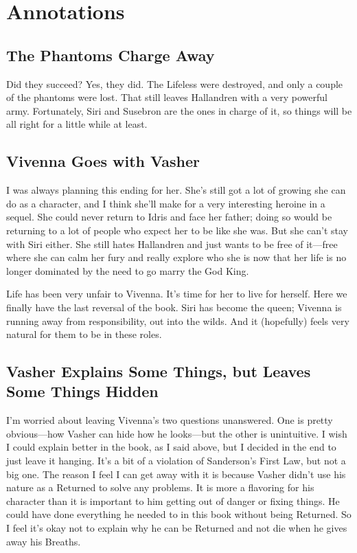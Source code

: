 \documentclass{article}
\begin{document}
\section{Annotations}

\subsection*{The Phantoms Charge Away}

Did they succeed? Yes, they did. The Lifeless were destroyed, and only a couple of the phantoms were lost. That still leaves Hallandren with a very powerful army. Fortunately, Siri and Susebron are the ones in charge of it, so things will be all right for a little while at least.

\subsection*{Vivenna Goes with Vasher}

I was always planning this ending for her. She’s still got a lot of growing she can do as a character, and I think she’ll make for a very interesting heroine in a sequel. She could never return to Idris and face her father; doing so would be returning to a lot of people who expect her to be like she was. But she can’t stay with Siri either. She still hates Hallandren and just wants to be free of it—free where she can calm her fury and really explore who she is now that her life is no longer dominated by the need to go marry the God King.

Life has been very unfair to Vivenna. It’s time for her to live for herself. Here we finally have the last reversal of the book. Siri has become the queen; Vivenna is running away from responsibility, out into the wilds. And it (hopefully) feels very natural for them to be in these roles.

\subsection*{Vasher Explains Some Things, but Leaves Some Things Hidden}

I’m worried about leaving Vivenna’s two questions unanswered. One is pretty obvious—how Vasher can hide how he looks—but the other is unintuitive. I wish I could explain better in the book, as I said above, but I decided in the end to just leave it hanging. It’s a bit of a violation of Sanderson’s First Law, but not a big one. The reason I feel I can get away with it is because Vasher didn’t use his nature as a Returned to solve any problems. It is more a flavoring for his character than it is important to him getting out of danger or fixing things. He could have done everything he needed to in this book without being Returned. So I feel it’s okay not to explain why he can be Returned and not die when he gives away his Breaths.
\end{document}
